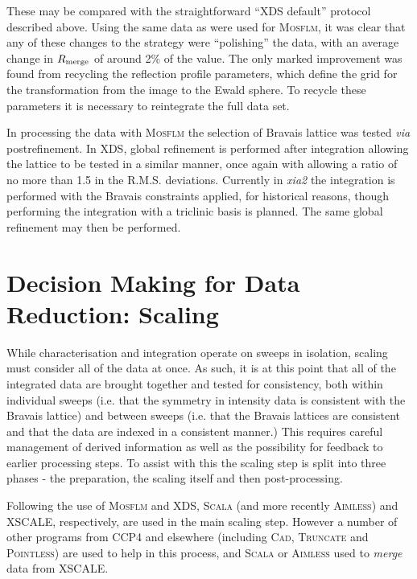 \documentclass[a4paper, 11pt]{article}
\begin{document}
\noindent
These may be compared with the straightforward ``XDS default''
protocol described above. Using
the same data as were used for \textsc{Mosflm}, it was
clear that any of these changes to the strategy were ``polishing'' the
data, with an average change in $R_{\rm{merge}}$ of around 2\% of the
value. The only marked improvement was found from recycling the
reflection profile parameters, which define the grid for the
transformation from the image to the Ewald sphere.
To recycle these parameters it is necessary to reintegrate the full data set.

In processing the data with \textsc{Mosflm} the selection of Bravais lattice
was tested \emph{via} postrefinement. In XDS, global refinement is
performed after integration allowing the lattice to be tested in a
similar manner, once again with allowing a ratio of no more than 1.5
in the R.M.S. deviations. Currently in
\emph{xia2} the integration is performed with the Bravais constraints
applied, for historical reasons, though performing the integration
with a triclinic basis is planned. The same global refinement may then
be performed.

\section{Decision Making for Data Reduction: Scaling}

While characterisation and integration operate on sweeps in isolation,
scaling must consider all of the data at once. As such, it is at this
point that all of the integrated data are brought together and tested
for consistency, both within individual sweeps (i.e. that the symmetry
in intensity data is consistent with the Bravais lattice) and between
sweeps (i.e. that the Bravais lattices are consistent and that the
data are indexed in a consistent manner.) This requires careful
management of derived information as well as the possibility for feedback to
earlier processing steps. To assist with this the scaling step is
split into three phases - the preparation, the scaling itself and then
post-processing.

Following the use of \textsc{Mosflm} and XDS, \textsc{Scala} 
(and more recently \textsc{Aimless}) and
XSCALE, respectively, 
are used in the main scaling step. However a number of other
programs from CCP4 and elsewhere (including \textsc{Cad}, 
\textsc{Truncate} and
\textsc{Pointless}) are used to help in this process, and
\textsc{Scala} or \textsc{Aimless} used to \emph{merge} data from XSCALE.
\end{document}
